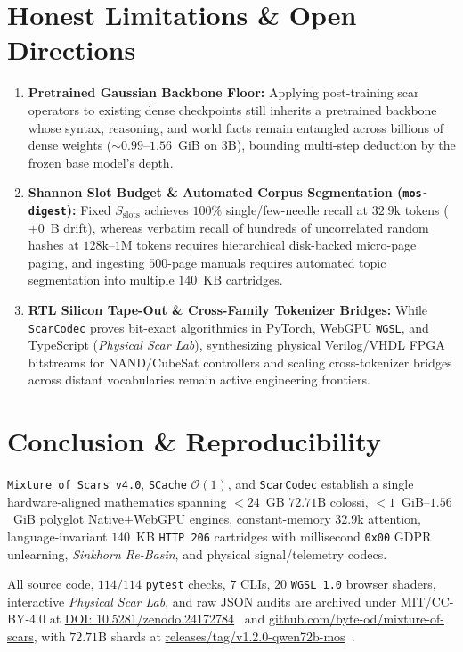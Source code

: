 \documentclass[10pt,twocolumn]{article}
\newif\ifanonymous
\begin{document}
\section{Honest Limitations \& Open Directions}
\begin{enumerate}
    \item \textbf{Pretrained Gaussian Backbone Floor:} Applying post-training scar operators to existing dense checkpoints still inherits a pretrained backbone whose syntax, reasoning, and world facts remain entangled across billions of dense weights ($\sim 0.99$--$1.56$~GiB on $3\text{B}$), bounding multi-step deduction by the frozen base model's depth.
    \item \textbf{Shannon Slot Budget \& Automated Corpus Segmentation (\texttt{mos-digest}):} Fixed $S_{\text{slots}}$ achieves $100\%$ single/few-needle recall at $32.9\text{k}$ tokens ($+0$~B drift), whereas verbatim recall of hundreds of uncorrelated random hashes at $128\text{k}$--$1\text{M}$ tokens requires hierarchical disk-backed micro-page paging, and ingesting $500$-page manuals requires automated topic segmentation into multiple $140$~KB cartridges.
    \item \textbf{RTL Silicon Tape-Out \& Cross-Family Tokenizer Bridges:} While \texttt{ScarCodec} proves bit-exact algorithmics in PyTorch, WebGPU \texttt{WGSL}, and TypeScript (\emph{Physical Scar Lab}), synthesizing physical Verilog/VHDL FPGA bitstreams for NAND/CubeSat controllers and scaling cross-tokenizer bridges across distant vocabularies remain active engineering frontiers.
\end{enumerate}

\section{Conclusion \& Reproducibility}
\texttt{Mixture of Scars v4.0}, \texttt{SCache} $\mathcal{O}(1)$, and \texttt{ScarCodec} establish a single hardware-aligned mathematics spanning $<24$~GB $72.71\text{B}$ colossi, $<1$~GiB--$1.56$~GiB polyglot Native+WebGPU engines, constant-memory $32.9\text{k}$ attention, language-invariant $140$~KB \texttt{HTTP 206} cartridges with millisecond \texttt{0x00} GDPR unlearning, \emph{Sinkhorn Re-Basin}, and physical signal/telemetry codecs.
\ifanonymous
All source code, $114/114$ \texttt{pytest} checks across $29$ suites, $7$ CLIs (\texttt{mos-run}, \texttt{mos-store}, \texttt{mos-graft}, \texttt{mos-rebasin}, \texttt{mos-transcode-sub2bit}, \texttt{mos-webgpu}, \texttt{mos-scar-codec}), $20$ \texttt{WGSL} shaders, and JSON audits are included in the supplementary archive.
\else
All source code, $114/114$ \texttt{pytest} checks, $7$ CLIs, $20$ \texttt{WGSL 1.0} browser shaders, interactive \emph{Physical Scar Lab}, and raw JSON audits are archived under MIT/CC-BY-4.0 at \href{https://doi.org/10.5281/zenodo.24172784}{DOI: 10.5281/zenodo.24172784}~\citep{reisfilho2026mos_zenodo} and \href{https://github.com/byte-od/mixture-of-scars}{github.com/byte-od/mixture-of-scars}, with $72.71\text{B}$ shards at \href{https://github.com/byte-od/mixture-of-scars/releases/tag/v1.2.0-qwen72b-mos}{releases/tag/v1.2.0-qwen72b-mos}~\citep{reisfilho2026qwen72b_mos_v2}.
\fi



\end{document}
